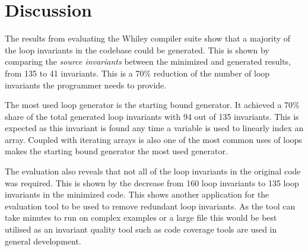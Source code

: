 \section{Discussion}

The results from evaluating the Whiley compiler suite show that a majority of
the loop invariants in the codebase could be generated.
This is shown by comparing the \textit{source invariants} between the
minimized and generated results, from 135 to 41 invariants.
This is a 70\% reduction of the number of loop invariants the programmer needs to provide.

The most used loop generator is the starting bound generator.
It achieved a 70\% share of the total generated loop invariants with 94 out of
135 invariants.
This is expected as this invariant is found any time a variable
is used to linearly index an array.
Coupled with iterating arrays is also one of the most common uses of loops
makes the starting bound generator the most used generator.

The evaluation also reveals that not all of the loop invariants in the original
code was required.
This is shown by the decrease from 160 loop invariants to 135 loop invariants
in the minimized code.
This shows another application for the evaluation tool to be used to remove redundant
loop invariants.
As the tool can take minutes to run on complex examples or a large file this
would be best utilised as an invariant quality tool such as code coverage tools
are used in general development.
